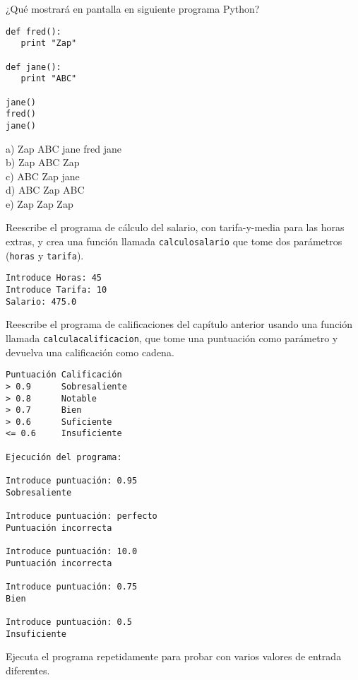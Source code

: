 \begin{ex}
¿Qué mostrará en pantalla en siguiente programa Python?

\beforeverb
\begin{verbatim}
def fred():
   print "Zap"

def jane():
   print "ABC"

jane()
fred()
jane()
\end{verbatim}
\afterverb
%
a) Zap ABC jane fred jane\\
b) Zap ABC Zap\\
c) ABC Zap jane\\
d) ABC Zap ABC\\
e) Zap Zap Zap
\end{ex}

\begin{ex}
Reescribe el programa de cálculo del salario, con tarifa-y-media para las horas extras,
y crea una función llamada {\tt calculosalario} que tome
dos parámetros ({\tt horas} y {\tt tarifa}).

\begin{verbatim}
Introduce Horas: 45
Introduce Tarifa: 10
Salario: 475.0
\end{verbatim}
\end{ex}

\begin{ex}
Reescribe el programa de calificaciones del capítulo anterior
usando una función llamada {\tt calculacalificacion}, que tome
una puntuación como parámetro y devuelva una calificación como cadena.

\begin{verbatim}
Puntuación Calificación
> 0.9      Sobresaliente
> 0.8      Notable
> 0.7      Bien
> 0.6      Suficiente
<= 0.6     Insuficiente

Ejecución del programa:

Introduce puntuación: 0.95
Sobresaliente

Introduce puntuación: perfecto
Puntuación incorrecta

Introduce puntuación: 10.0
Puntuación incorrecta

Introduce puntuación: 0.75
Bien

Introduce puntuación: 0.5
Insuficiente
\end{verbatim}

Ejecuta el programa repetidamente para probar con varios valores
de entrada diferentes.
\end{ex}